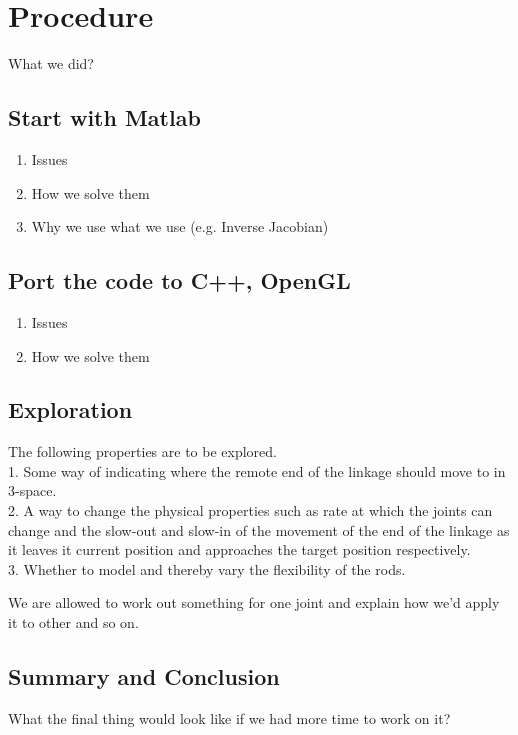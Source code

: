 \documentclass[paper=a4, fontsize=11pt]{scrartcl} %
\numberwithin{equation}{section} %
\numberwithin{figure}{section} %
\numberwithin{table}{section} %
\begin{document}

\section{Procedure}
What we did?

\subsection{Start with Matlab}
    \begin{enumerate}
    \item Issues
    \item How we solve them
    \item Why we use what we use (e.g. Inverse Jacobian)
  \end{enumerate}
\subsection{ Port the code to C++, OpenGL}
    \begin{enumerate}
    \item Issues
    \item How we solve them
  \end{enumerate}
  
\subsection{Exploration}
The following properties are to be explored.\\
1. Some way of indicating where the remote end of the linkage should move to in 3-space.\\
2. A way to change the physical properties such as rate at which the joints can change and the slow-out and slow-in of the movement of the end of the linkage as it leaves it current position and approaches the target position respectively.\\
3. Whether to model and thereby vary the flexibility of the rods.


We are allowed to work out something for one joint and explain how we'd apply it to other and so on.

\subsection{Summary and Conclusion}
What the final thing would look like if we had more time to work on it?

\end{document}
